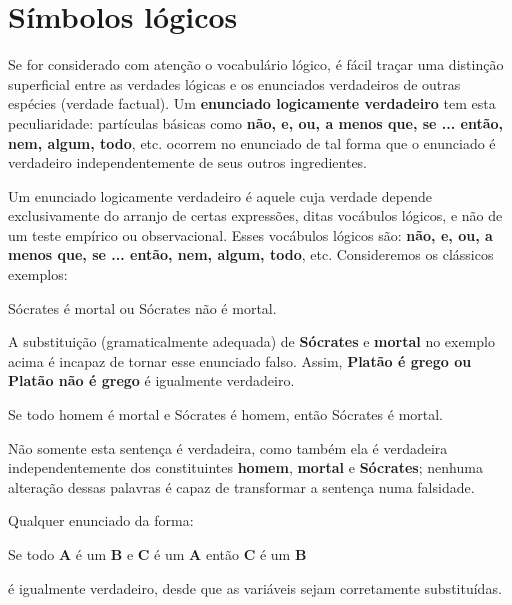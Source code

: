 \newpage

\section{Símbolos lógicos}

Se for considerado com atenção o vocabulário lógico, é fácil traçar uma distinção superficial entre as verdades lógicas e os enunciados verdadeiros de outras espécies (verdade factual).
Um \textbf{enunciado logicamente verdadeiro} tem esta peculiaridade: partículas básicas como \textbf{não, e, ou, a menos que, se ... então, nem, algum, todo}, etc. ocorrem no enunciado de tal forma que o enunciado é verdadeiro independentemente de seus outros ingredientes.

Um enunciado logicamente verdadeiro é aquele cuja verdade depende exclusivamente do arranjo de certas expressões, ditas vocábulos lógicos, e não de um teste empírico ou observacional.
Esses vocábulos lógicos são: \textbf{não, e, ou, a menos que, se ... então, nem, algum, todo}, etc.
Consideremos os clássicos exemplos:

\bigskip
\begin{exemplo} Sócrates é mortal ou Sócrates não é mortal.
\end{exemplo}

\bigskip
\noindent
A substituição (gramaticalmente adequada) de \textbf{Sócrates} e \textbf{mortal} no exemplo acima é incapaz de tornar esse enunciado falso.
Assim, \textbf{Platão é grego ou Platão não é grego} é igualmente verdadeiro.

\bigskip
\begin{exemplo} Se todo homem é mortal e Sócrates é homem, então Sócrates é mortal.
\end{exemplo}

\bigskip
\noindent
Não somente esta sentença é verdadeira, como também ela é verdadeira independentemente dos constituintes \textbf{homem}, \textbf{mortal} e \textbf{Sócrates}; nenhuma alteração dessas palavras é capaz de transformar a sentença numa falsidade.

\newpage

\noindent Qualquer enunciado da forma:

\begin{center}
    Se todo \textbf{A} é um \textbf{B} e \textbf{C} é um \textbf{A} então \textbf{C} é um \textbf{B}
\end{center}

\noindent é igualmente verdadeiro, desde que as variáveis sejam corretamente substituídas.

